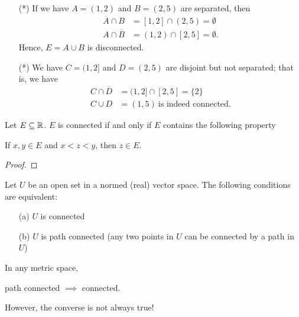 \documentclass[a4paper]{report}
\begin{document}
\begin{eg}
\begin{enumerate}
    \item[(*)] If we have \( A = (1,2)  \) and \( B = (2,5) \) are separated, then
        \begin{align*}
            \overline{A} \cap B &= [1,2] \cap (2,5) = \emptyset \\
            A \cap \overline{B} &= (1,2) \cap [2,5] = \emptyset.
        \end{align*}
        Hence, \( E = A \cup B  \) is disconnected.
    \item[(*)] We have \( C = (1,2] \) and \( D = (2,5) \) are disjoint but not separated; that is, we have
        \begin{align*}
            C \cap \overline{D} &= (1,2] \cap [2,5] = \{ 2 \}  \\
            C \cup D &= (1,5) \ \text{is indeed connected.}
        \end{align*}
\end{enumerate}    
\end{eg}

\begin{theorem}[ ]
    Let \( E \subseteq \mathbb{R} \). \( E  \) is connected if and only if \( E  \) contains the following property
    \begin{center}
        If \( x,y \in E  \) and \( x < z < y  \), then \( z \in E  \).
    \end{center}
\end{theorem}
\begin{proof}

\end{proof}

\begin{remark}
    Let \( U  \) be an open set in a normed (real) vector space. The following conditions are equivalent:
    \begin{enumerate}
        \item[(a)] \( U \) is connected
        \item[(b)] \( U  \) is path connected (any two points in \( U  \) can be connected by a path in \( U  \))
    \end{enumerate}
\end{remark}

\begin{remark}
   In any metric space,  
   \begin{center}
       path connected \( \implies \) connected.
   \end{center}
   However, the converse is not always true!
\end{remark}
\end{document}
